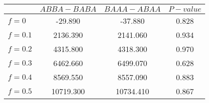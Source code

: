 \begin{tabular}{lccc}
\toprule
 & $ABBA-BABA$ & $BAAA-ABAA$ & $P-value$ \\
\midrule
$f = 0$ & -29.890 & -37.880 & 0.828 \\
$f = 0.1$ & 2136.390 & 2141.060 & 0.934 \\
$f = 0.2$ & 4315.800 & 4318.300 & 0.970 \\
$f = 0.3$ & 6462.660 & 6499.070 & 0.628 \\
$f = 0.4$ & 8569.550 & 8557.090 & 0.883 \\
$f = 0.5$ & 10719.300 & 10734.410 & 0.867 \\
\bottomrule
\end{tabular}
